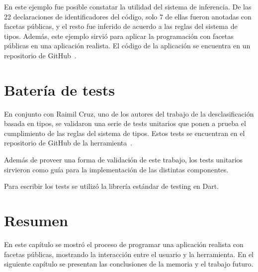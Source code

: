  En este ejemplo fue posible constatar la utilidad del sistema de inferencia. De las 22 declaraciones de identificadores del código, solo 7 de ellas fueron anotadas con facetas públicas, y el resto fue inferido de acuerdo a las reglas del sistema de tipos. Además, este ejemplo sirvió para aplicar la programación con facetas públicas en una aplicación realista. El código de la aplicación se encuentra en un repositorio de GitHub~\cite{repotest}.

\section{Batería de tests}
En conjunto con Raimil Cruz, uno de los autores del trabajo de la desclasificación basada en tipos, se validaron una serie de tests unitarios que ponen a prueba el cumplimiento de las reglas del sistema de tipos. Estos tests se encuentran en el repositorio de GitHub de la herramienta~\cite{repounit}.

Además de proveer una forma de validación de este trabajo, los tests unitarios sirvieron como guía para la implementación de las distintas componentes.

Para escribir los tests se utilizó la librería estándar de testing en Dart.

\section*{Resumen}
En este capítulo se mostró el proceso de programar una aplicación realista con facetas públicas, mostrando la interacción entre el usuario y la herramienta. En el siguiente capítulo se presentan las conclusiones de la memoria y el trabajo futuro.
